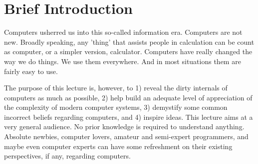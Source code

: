 \documentclass[main]{subfiles}
\begin{document}
\section{Brief Introduction}
Computers usherred us into this so-called information era. Computers are not
new. Broadly speaking, any 'thing' that assists people in calculation can be
count as computer, or a simpler version, calculator. Computers have really
changed the way we do things. We use them everywhere. And in most situations 
them are fairly easy to use. 

The purpose of this lecture is, however, to 1) reveal the dirty internals of
computers as much as possible, 2) help build an adequate level of appreciation 
of the complexity of modern computer systems, 3) demystify some common incorrect
beliefs regarding computers, and 4) inspire ideas. This lecture aims at a very
general audience. No prior knowledge is required to understand anything.
Absolute newbies, computer lovers, amateur and semi-expert programmers, and 
maybe even computer experts can have some refreshment on their existing
perspectives, if any, regarding computers.
\end{document}
